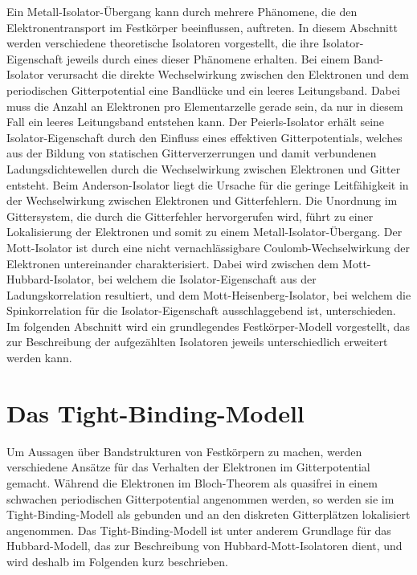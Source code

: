 Ein Metall-Isolator-Übergang kann durch mehrere Phänomene, die den Elektronentransport im Festkörper beeinflussen, auftreten.
In diesem Abschnitt werden verschiedene theoretische Isolatoren vorgestellt, die ihre Isolator-Eigenschaft jeweils durch eines dieser Phänomene erhalten.
Bei einem Band-Isolator verursacht die direkte Wechselwirkung zwischen den Elektronen und dem periodischen Gitterpotential eine Bandlücke und ein leeres Leitungsband.
Dabei muss die Anzahl an Elektronen pro Elementarzelle gerade sein, da nur in diesem Fall ein leeres Leitungsband entstehen kann.
Der Peierls-Isolator erhält seine Isolator-Eigenschaft durch den Einfluss eines effektiven Gitterpotentials, welches aus der Bildung von statischen Gitterverzerrungen
und damit verbundenen Ladungsdichtewellen durch die Wechselwirkung zwischen Elektronen und Gitter entsteht.
Beim Anderson-Isolator liegt die Ursache für die geringe Leitfähigkeit in der Wechselwirkung zwischen Elektronen und Gitterfehlern.
Die Unordnung im Gittersystem, die durch die Gitterfehler hervorgerufen wird, führt zu einer Lokalisierung der Elektronen und somit zu einem Metall-Isolator-Übergang.
Der Mott-Isolator ist durch eine nicht vernachlässigbare Coulomb-Wechselwirkung der Elektronen untereinander charakterisiert.
Dabei wird zwischen dem Mott-Hubbard-Isolator, bei welchem die Isolator-Eigenschaft aus der Ladungskorrelation resultiert,
und dem Mott-Heisenberg-Isolator, bei welchem die Spinkorrelation für die Isolator-Eigenschaft ausschlaggebend ist, unterschieden.
Im folgenden Abschnitt wird ein grundlegendes Festkörper-Modell vorgestellt, das zur Beschreibung der aufgezählten Isolatoren jeweils unterschiedlich erweitert werden kann.
\cite{czycholl,gebhard}

\section{Das Tight-Binding-Modell}

Um Aussagen über Bandstrukturen von Festkörpern zu machen, werden verschiedene Ansätze für das Verhalten der Elektronen im Gitterpotential gemacht.
Während die Elektronen im Bloch-Theorem als quasifrei in einem schwachen periodischen Gitterpotential angenommen werden, so werden sie
im Tight-Binding-Modell als gebunden und an den diskreten Gitterplätzen lokalisiert angenommen. Das Tight-Binding-Modell ist unter anderem Grundlage für das Hubbard-Modell,
das zur Beschreibung von Hubbard-Mott-Isolatoren dient, und wird deshalb im Folgenden kurz beschrieben.

